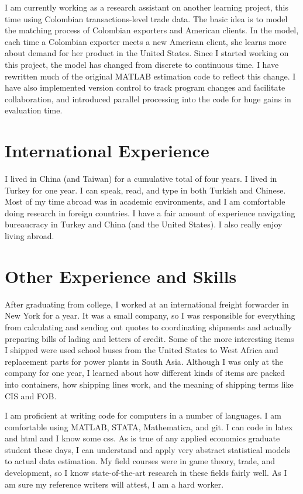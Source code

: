 \documentclass[a4paper,10pt]{article}
\begin{document}
I am currently working as a research assistant on another learning project, this time using Colombian transactions-level trade data.  The basic idea is to model the matching process of Colombian exporters and American clients. In the model, each time a Colombian exporter meets a new American client, she learns more about demand for her product in the United States.  Since I started working on this project, the model has changed from discrete to continuous time.  I have rewritten much of the original MATLAB estimation code to reflect this change.  I have also implemented version control to track program changes and facilitate collaboration, and introduced parallel processing into the code for huge gains in evaluation time.  

\section*{International Experience}
I lived in China (and Taiwan) for a cumulative total of four years.  I lived in Turkey for one year.  I can speak, read, and type in both Turkish and Chinese.  Most of my time abroad was in academic environments, and I am comfortable doing research in foreign countries.  I have a fair amount of experience navigating bureaucracy in Turkey and China (and the United States).  I also really enjoy living abroad.

\section*{Other Experience and Skills}
After graduating from college, I worked at an international freight forwarder in New York for a year.  It was a small company, so I was responsible for everything from calculating and sending out quotes to coordinating shipments and actually preparing bills of lading and letters of credit.  Some of the more interesting items I shipped were used school buses from the United States to West Africa and replacement parts for power plants in South Asia.  Although I was only at the company for one year, I learned about how different kinds of items are packed into containers, how shipping lines work, and the meaning of shipping terms like CIS and FOB.

I am proficient at writing code for computers in a number of languages.  I am comfortable using MATLAB, STATA, Mathematica, and git.  I can code in latex and html and I know some css.  As is true of any applied economics graduate student these days, I can understand and apply very abstract statistical models to actual data estimation.  My field courses were in game theory, trade, and development, so I know state-of-the-art research in these fields fairly well.  As I am sure my reference writers will attest, I am a hard worker.
\end{document}
